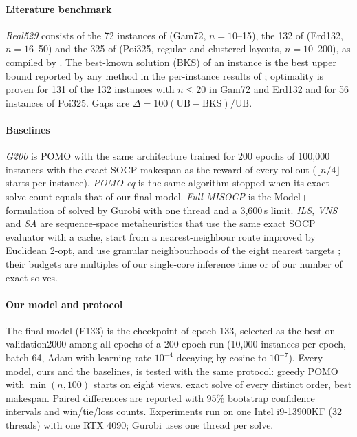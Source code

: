 \documentclass[preprint,review,12pt,authoryear]{elsarticle}
\newcommand{\UB}{\mathrm{UB}}
\begin{document}
\paragraph{Literature benchmark}
\emph{Real529} consists of the 72 instances of \citet{gambella2018exact} (Gam72, $n=10$--15), the 132 of
\citet{erdogan2021exact} (Erd132, $n=16$--50) and the 325 of \citet{poikonen2020mothership} (Poi325, regular and
clustered layouts, $n=10$--200), as compiled by \citet{li2025exact}. The best-known solution (BKS) of an
instance is the best upper bound reported by any method in the per-instance results of \citet{li2025exact};
optimality is proven for 131 of the 132 instances with $n\le20$ in Gam72 and Erd132 and for 56 instances of
Poi325. Gaps are $\Delta=100(\UB-\mathrm{BKS})/\UB$.

\paragraph{Baselines}
\emph{G200} is POMO with the same architecture trained for 200 epochs of 100{,}000 instances with the exact
SOCP makespan as the reward of every rollout ($\lfloor n/4\rfloor$ starts per instance). \emph{POMO-eq} is the
same algorithm stopped when its exact-solve count equals that of our final model. \emph{Full MISOCP} is the
Model+ formulation of \citet{li2025exact} solved by Gurobi with one thread and a 3{,}600\,s limit. \emph{ILS},
\emph{VNS} and \emph{SA} are sequence-space metaheuristics that use the same exact SOCP evaluator with a cache,
start from a nearest-neighbour route improved by Euclidean 2-opt, and use granular neighbourhoods of the eight
nearest targets \citep{toth2003granular}; their budgets are multiples of our single-core inference time or of our
number of exact solves.

\paragraph{Our model and protocol}
The final model (E133) is the checkpoint of epoch 133, selected as the best on validation2000 among all epochs
of a 200-epoch run (10{,}000 instances per epoch, batch 64, Adam with learning rate $10^{-4}$ decaying by cosine
to $10^{-7}$). Every model, ours and the baselines, is tested with the same protocol: greedy POMO with
$\min(n,100)$ starts on eight views, exact solve of every distinct order, best makespan. Paired differences are
reported with 95\% bootstrap confidence intervals and win/tie/loss counts. Experiments run on one Intel
i9-13900KF (32 threads) with one RTX 4090; Gurobi uses one thread per solve.
\end{document}
